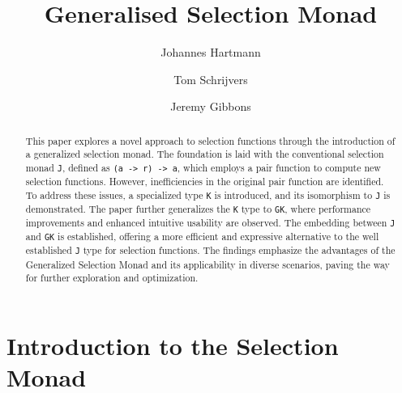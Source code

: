 \documentclass[runningheads]{llncs}
\newcommand{\ignore}[1]{}
\begin{document}
\title{Generalised Selection Monad}

\author{
    Johannes Hartmann \and 
    Tom Schrijvers\and 
    Jeremy Gibbons
}
%


%
\maketitle              %
%
\begin{abstract}
This paper explores a novel approach to selection functions through the
introduction of a generalized selection monad. The foundation is laid
with the conventional selection monad \texttt{J}, defined as
\texttt{(a\ -\textgreater{}\ r)\ -\textgreater{}\ a}, which employs a
pair function to compute new selection functions. However,
inefficiencies in the original pair function are identified. To address
these issues, a specialized type \texttt{K} is introduced, and its
isomorphism to \texttt{J} is demonstrated. The paper further generalizes
the \texttt{K} type to \texttt{GK}, where performance improvements and
enhanced intuitive usability are observed. The embedding between
\texttt{J} and \texttt{GK} is established, offering a more efficient and
expressive alternative to the well established \texttt{J} type for
selection functions. The findings emphasize the advantages of the
Generalized Selection Monad and its applicability in diverse scenarios,
paving the way for further exploration and optimization.

\end{abstract}
%
%
%
\ignore{

> {-# LANGUAGE ImpredicativeTypes #-}
> {-# LANGUAGE ScopedTypeVariables #-}

> import Prelude hiding ((>>=), return, pure, (<*>), fmap, sequence, Left, Right)

}

\section{Introduction to the Selection
Monad}\label{introduction-to-the-selection-monad}
\end{document}
